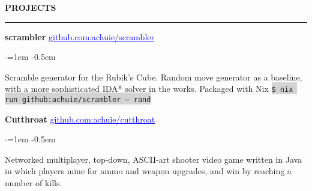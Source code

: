 \documentclass[10pt, a4paper]{article}
\newenvironment{aSection}[1]{
    \medskip \textbf{\uppercase{#1}}
    \smallskip
    \hrule
    \begin{list}{}{
            \setlength{\leftmargin}{1.5em}
        }
    \item[]
    }{
    \end{list}
}
\newenvironment{projSubsection}[2]{
    {#1} \hfill {#2}
    \smallskip
    \begin{list}{$\cdot$}{\leftmargin=1em}
    \itemsep -0.5em \vspace{-0.5em}
    }{
    \end{list}
    \vspace{0.5em}
}
\begin{document}
\begin{aSection}{Projects}
    \begin{projSubsection}
        {\textbf{scrambler}}
        {\href{https://www.github.com/achuie/scrambler}{\textcolor{blue}{\underline{github.com:achuie/scrambler}}}}
    \item[] Scramble generator for the Rubik's Cube. Random move generator as a baseline, with a more sophisticated IDA*
        solver in the works. Packaged with Nix \colorbox{lightgray}{\texttt{\$ nix run github:achuie/scrambler -- rand}}
    \end{projSubsection}

    \begin{projSubsection}
        {\textbf{Cutthroat}}
        {\href{https://www.github.com/achuie/cutthroat}{\textcolor{blue}{\underline{github.com:achuie/cutthroat}}}}
    \item[] Networked multiplayer, top-down, ASCII-art shooter video game written in Java in which
        players mine for ammo and weapon upgrades, and win by reaching a number of kills.
    \end{projSubsection}
\end{aSection}
\end{document}
